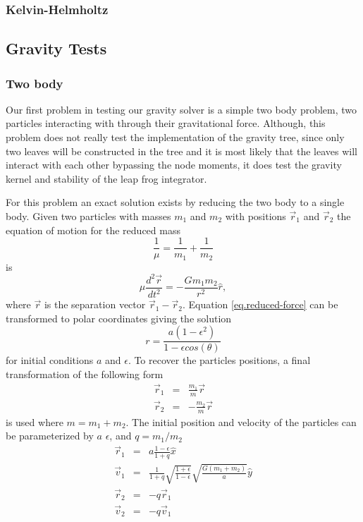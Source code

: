 \subsubsection{Kelvin-Helmholtz}

\subsection{Gravity Tests}
\subsubsection{Two body}
Our first problem in testing our gravity solver is a simple two body problem, two particles interacting
with through their gravitational force. Although, this problem does not really test the 
implementation of the gravity tree, since only two leaves will be constructed
in the tree and it is most likely that the leaves will interact with each other bypassing the node 
moments, it does test the gravity kernel and stability of the leap frog integrator.

For this problem an exact solution exists by reducing the two body to a single body. Given
two particles with masses $m_1$ and $m_2$ with positions $\vec{r}_1$ and $\vec{r}_2$ the equation of motion for
the reduced mass
\begin{equation}
	\frac{1}{\mu} = \frac{1}{m_1} + \frac{1}{m_2}
\end{equation}
is
\begin{equation}
	\mu\frac{d^2 \vec{r}}{dt^2} = -\frac{G m_1 m_2}{r^2}\hat{r},
    \label{eq.reduced-force}
\end{equation}
where $\vec{r}$ is the separation vector $\vec{r}_1 - \vec{r}_2$. Equation \ref{eq.reduced-force} can be
transformed to polar coordinates giving the solution
\begin{equation}
	r = \frac{a(1-\epsilon^2)}{1-\epsilon cos(\theta)}
\end{equation}
for initial conditions $a$ and $\epsilon$. To recover the particles positions, a final transformation
of the following form
\begin{equation}
	\begin{array}{rcl}
		\vec{r}_1 & = & \frac{m_1}{m}\vec{r}\\
    	\vec{r}_2 & = & -\frac{m_2}{m}\vec{r}
    \end{array}
\end{equation}
is used where $m=m_1 + m_2$. The initial position and velocity of the particles can be parameterized by $a$
$\epsilon$, and $q=m_1/m_2$
\begin{equation}
	\begin{array}{rcl}
    	\vec{r}_1 & = & a\frac{1-\epsilon}{1+q} \hat{x}\\
        \vec{v}_1 & = & \frac{1}{1+q}\sqrt{\frac{1+\epsilon}{1-\epsilon}}\sqrt{\frac{G(m_1 + m_2)}{a}} \hat{y}\\
        \vec{r}_2 & = & -q \vec{r}_1\\
        \vec{v}_2 & = & -q \vec{v}_1
        
    \end{array}
\end{equation}

